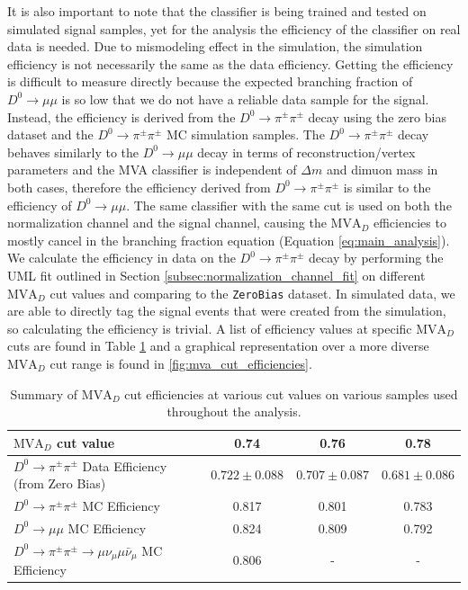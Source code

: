 It is also important to note that the classifier is being trained and tested on simulated signal samples, yet for the analysis the efficiency of the classifier on real data is needed. Due to mismodeling effect in the simulation, the simulation efficiency is not necessarily the same as the data efficiency. Getting the efficiency is difficult to measure directly because the expected branching fraction of $D^0 \to \mu \mu$ is so low that we do not have a reliable data sample for the signal. Instead, the efficiency is derived from the $D^0 \to \pi^\pm \pi^\pm$ decay using the zero bias dataset and the $D^0 \to \pi^\pm \pi^\pm$ MC simulation samples. The $D^0 \to \pi^\pm \pi^\pm$ decay behaves similarly to the $D^0 \to \mu \mu$ decay in terms of reconstruction/vertex parameters and the MVA classifier is independent of $\Delta m$ and dimuon mass in both cases, therefore the efficiency derived from $D^0 \to \pi^\pm \pi^\pm$ is similar to the efficiency of $D^0 \to \mu \mu$. The same classifier with the same cut is used on both the normalization channel and the signal channel, causing the $\text{MVA}_D$ efficiencies to mostly cancel in the branching fraction equation (Equation \ref{eq:main_analysis}). We calculate the efficiency in data on the $D^0 \to \pi^\pm \pi^\pm$ decay by performing the UML fit outlined in Section \ref{subsec:normalization_channel_fit} on different $\text{MVA}_D$ cut values and comparing to the \texttt{ZeroBias} dataset. In simulated data, we are able to directly tag the signal events that were created from the simulation, so calculating the efficiency is trivial. A list of efficiency values at specific $\text{MVA}_D$ cuts are found in Table \ref{tab:mva_cut_efficiencies} and a graphical representation over a more diverse $\text{MVA}_D$ cut range is found in \ref{fig:mva_cut_efficiencies}.

\begin{table}[htbp]
    \centering
    \begin{tabular}{|l|c|c|c|}
    \hline
    $\text{MVA}_D$ cut value & \textbf{0.74} & \textbf{0.76} & \textbf{0.78} \\
    \hline
    $D^0 \to \pi^\pm \pi^\pm$ Data Efficiency (from Zero Bias) & $0.722 \pm 0.088$ & $0.707 \pm 0.087$ & $0.681 \pm 0.086$ \\
    $D^0 \to \pi^\pm \pi^\pm$ MC Efficiency & 0.817 & 0.801 & 0.783 \\
    $D^0 \to \mu \mu$ MC Efficiency & 0.824 & 0.809 & 0.792 \\
    $D^0 \to \pi^\pm \pi^\pm \to \mu \nu_\mu\mu\bar{\nu}_\mu$ MC Efficiency & 0.806 & - & - \\
    \hline
    \end{tabular}
    \caption{Summary of $\text{MVA}_D$ cut efficiencies at various cut values on various samples used throughout the analysis.}
    \label{tab:mva_cut_efficiencies}
\end{table}

